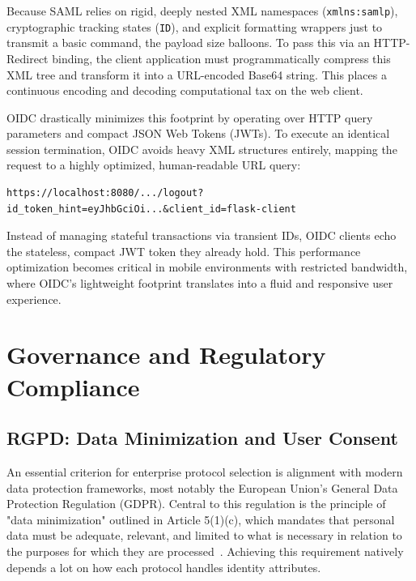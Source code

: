 \documentclass[../memoire.tex]{subfiles}
\begin{document}
Because SAML relies on rigid, deeply nested XML namespaces (\texttt{xmlns:samlp}), cryptographic tracking states (\texttt{ID}), and explicit formatting wrappers just to transmit a basic command, the payload size balloons. To pass this via an HTTP-Redirect binding, the client application must programmatically compress this XML tree and transform it into a URL-encoded Base64 string. This places a continuous encoding and decoding computational tax on the web client.

OIDC drastically minimizes this footprint by operating over HTTP query parameters and compact JSON Web Tokens (JWTs). To execute an identical session termination, OIDC avoids heavy XML structures entirely, mapping the request to a highly optimized, human-readable URL query:

\begin{verbatim}
https://localhost:8080/.../logout?id_token_hint=eyJhbGciOi...&client_id=flask-client
\end{verbatim}

Instead of managing stateful transactions via transient IDs, OIDC clients echo the stateless, compact JWT token they already hold. This performance optimization becomes critical in mobile environments with restricted bandwidth, where OIDC's lightweight footprint translates into a fluid and responsive user experience.

\section{Governance and Regulatory Compliance}


\subsection{RGPD: Data Minimization and User Consent}

An essential criterion for enterprise protocol selection is alignment with modern data protection frameworks, most notably the European Union's General Data Protection Regulation (GDPR). Central to this regulation is the principle of "data minimization" outlined in Article 5(1)(c), which mandates that personal data must be adequate, relevant, and limited to what is necessary in relation to the purposes for which they are processed~\cite{gdpr_2016}. Achieving this requirement natively depends a lot on how each protocol handles identity attributes.
\end{document}
